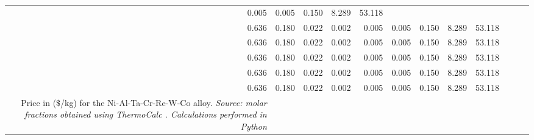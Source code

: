 \begin{longtable}{rrrrrrrrrrrr}
0.005 & 0.005 & 0.150 & 8.289 & 53.118 \\0.636 & 0.180 & 0.022 & 0.002 & 0.005 & 0.005 & 0.150 & 8.289 & 53.118 \\0.636 & 0.180 & 0.022 & 0.002 & 0.005 & 0.005 & 0.150 & 8.289 & 53.118 \\0.636 & 0.180 & 0.022 & 0.002 & 0.005 & 0.005 & 0.150 & 8.289 & 53.118 \\0.636 & 0.180 & 0.022 & 0.002 & 0.005 & 0.005 & 0.150 & 8.289 & 53.118 \\0.636 & 0.180 & 0.022 & 0.002 & 0.005 & 0.005 & 0.150 & 8.289 & 53.118 \\
    \caption{\centering Price in ($\$$/kg) for the Ni-Al-Ta-Cr-Re-W-Co alloy. \\
    \textit{Source: molar fractions obtained using ThermoCalc \citep{thermocalc}. Calculations  performed in Python \citep{mygit}}}
    \label{tab:tab14}
\end{longtable}